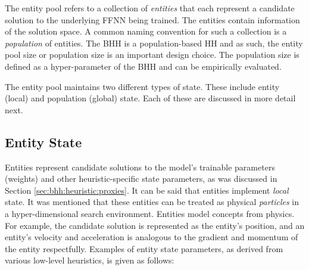 The entity pool refers to a collection of \textit{entities} that each represent a candidate solution to the underlying \acs{FFNN} being trained. The entities contain information of the solution space. A common naming convention for such a collection is a \textit{population} of entities. The \acs{BHH} is a population-based \acs{HH} and as such, the entity pool size or population size is an important design choice. The population size is defined as a hyper-parameter of the \acs{BHH} and can be empirically evaluated.

The entity pool maintains two different types of state. These include entity (local) and population (global) state. Each of these are discussed in more detail next.

\subsection{Entity State}\label{sec:bhh:entity_pool:entity_state}

Entities represent candidate solutions to the model's trainable parameters (weights) and other heuristic-specific state parameters, as was discussed in Section \ref{sec:bhh:heuristic:proxies}. It can be said that entities implement \textit{local} state. It was mentioned that these entities can be treated as physical \textit{particles} in a hyper-dimensional search environment. Entities model concepts from physics. For example, the candidate solution is represented as the entity's position, and an entity's velocity and acceleration is analogous to the gradient and momentum of the entity respectfully. Examples of entity state parameters, as derived from various low-level heuristics, is given as follows:

